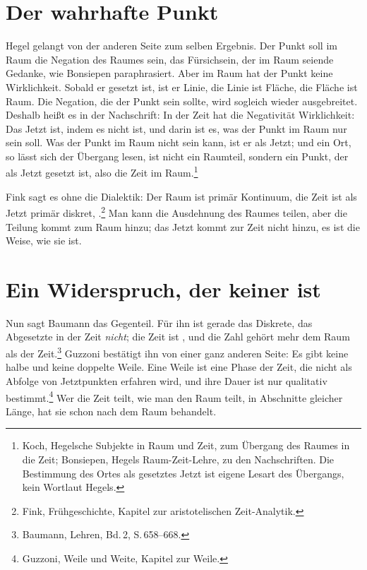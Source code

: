\section{Der wahrhafte Punkt}

Hegel gelangt von der anderen Seite zum selben Ergebnis. Der Punkt soll im Raum die Negation des Raumes sein, das Fürsichsein, der im Raum seiende Gedanke, wie Bonsiepen paraphrasiert. Aber im Raum hat der Punkt keine Wirklichkeit. Sobald er gesetzt ist, ist er Linie, die Linie ist Fläche, die Fläche ist Raum. Die Negation, die der Punkt sein sollte, wird sogleich wieder ausgebreitet. Deshalb heißt es in der Nachschrift:  In der Zeit hat die Negativität Wirklichkeit: Das Jetzt ist, indem es nicht ist, und darin ist es, was der Punkt im Raum nur sein soll. Was der Punkt im Raum nicht sein kann, ist er als Jetzt; und ein Ort, so lässt sich der Übergang lesen, ist nicht ein Raumteil, sondern ein Punkt, der als Jetzt gesetzt ist, also die Zeit im Raum.\footnote{Koch, Hegelsche Subjekte in Raum und Zeit, zum Übergang des Raumes in die Zeit; Bonsiepen, Hegels Raum-Zeit-Lehre, zu den Nachschriften. Die Bestimmung des Ortes als gesetztes Jetzt ist eigene Lesart des Übergangs, kein Wortlaut Hegels.}

Fink sagt es ohne die Dialektik: Der Raum ist primär Kontinuum, die Zeit ist als Jetzt primär diskret, .\footnote{Fink, Frühgeschichte, Kapitel zur aristotelischen Zeit-Analytik.} Man kann die Ausdehnung des Raumes teilen, aber die Teilung kommt zum Raum hinzu; das Jetzt kommt zur Zeit nicht hinzu, es ist die Weise, wie sie ist.

\section{Ein Widerspruch, der keiner ist}

Nun sagt Baumann das Gegenteil. Für ihn ist gerade das Diskrete, das Abgesetzte in der Zeit \emph{nicht}; die Zeit ist , und die Zahl gehört mehr dem Raum als der Zeit.\footnote{Baumann, Lehren, Bd.\,2, S.\,658--668.} Guzzoni bestätigt ihn von einer ganz anderen Seite: Es gibt keine halbe und keine doppelte Weile. Eine Weile ist eine Phase der Zeit, die nicht als Abfolge von Jetztpunkten erfahren wird, und ihre Dauer ist nur qualitativ bestimmt.\footnote{Guzzoni, Weile und Weite, Kapitel zur Weile.} Wer die Zeit teilt, wie man den Raum teilt, in Abschnitte gleicher Länge, hat sie schon nach dem Raum behandelt.

